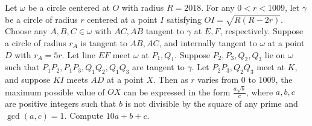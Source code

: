 Let $\omega$ be a circle centered at $O$ with radius $R=2018$. For any $0 < r < 1009$, let $\gamma$ be a circle of radius $r$ centered at a point $I$ satisfying $OI =\sqrt{R(R-2r)}$. Choose any $A,B,C\in \omega$ with $AC, AB$ tangent to $\gamma$ at $E,F$, respectively. Suppose a circle of radius $r_A$ is tangent to $AB,AC$, and internally tangent to $\omega$ at a point $D$ with $r_A=5r$. Let line $EF$ meet $\omega$ at $P_1,Q_1$. Suppose $P_2,P_3,Q_2,Q_3$ lie on $\omega$ such that $P_1P_2,P_1P_3,Q_1Q_2,Q_1Q_3$ are tangent to $\gamma$. Let $P_2P_3,Q_2Q_3$ meet at $K$, and suppose $KI$ meets $AD$ at a point $X$. Then as $r$ varies from $0$ to $1009$, the maximum possible value of $OX$ can be expressed in the form $\frac{a\sqrt{b}}{c}$, where $a,b,c$ are positive integers such that $b$ is not divisible by the square of any prime and $\gcd (a,c)=1$. Compute $10a+b+c$.
